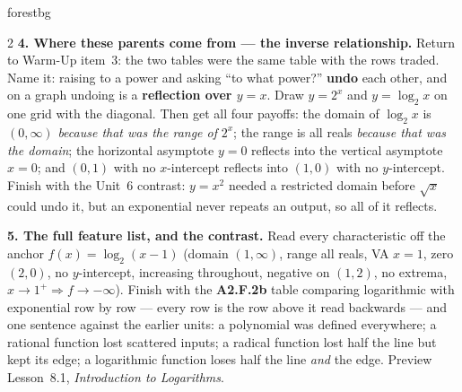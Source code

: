 \documentclass[10pt]{article}
\begin{document}
\begin{skillbox}[Lesson]{forestbg}
\begin{multicols}{2}
\textbf{4. Where these parents come from --- the inverse relationship.} Return to Warm-Up item~3: the
two tables were the same table with the rows traded. Name it: raising to a power and asking ``to what
power?'' \textbf{undo} each other, and on a graph undoing is a \textbf{reflection over $y=x$}. Draw
$y=2^x$ and $y=\log_2 x$ on one grid with the diagonal. Then get all four payoffs: the domain of
$\log_2 x$ is $(0,\infty)$ \emph{because that was the range of} $2^x$; the range is all reals
\emph{because that was the domain}; the horizontal asymptote $y=0$ reflects into the vertical
asymptote $x=0$; and $(0,1)$ with no $x$-intercept reflects into $(1,0)$ with no $y$-intercept. Finish
with the Unit~6 contrast: $y=x^2$ needed a restricted domain before $\sqrt{x}$ could undo it, but an
exponential never repeats an output, so all of it reflects.

\textbf{5. The full feature list, and the contrast.} Read every characteristic off the anchor
$f(x)=\log_2(x-1)$ (domain $(1,\infty)$, range all reals, VA $x=1$, zero $(2,0)$, no $y$-intercept,
increasing throughout, negative on $(1,2)$, no extrema, $x\to1^{+}\Rightarrow f\to-\infty$). Finish
with the \textbf{A2.F.2b} table comparing logarithmic with exponential row by row --- every row is the
row above it read backwards --- and one sentence against the earlier units: a polynomial was defined
everywhere; a rational function lost scattered inputs; a radical function lost half the line but kept
its edge; a logarithmic function loses half the line \emph{and} the edge. Preview Lesson~8.1,
\emph{Introduction to Logarithms}.
\end{multicols}
\end{skillbox}
\end{document}
